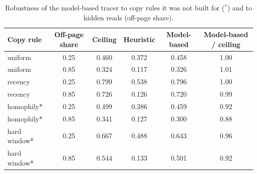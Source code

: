 \begin{table}[t]
\centering
\small
\caption{Robustness of the model-based tracer to copy rules it was not built for ($^{*}$) and to hidden reads (off-page share).}\label{tab:robust}
\begin{tabular}{@{}lccccc@{}}
\toprule
Copy rule & Off-page share & Ceiling & Heuristic & Model-based & Model-based / ceiling \\
\midrule
uniform & 0.25 & 0.460 & 0.372 & 0.458 & 1.00 \\
uniform & 0.85 & 0.324 & 0.117 & 0.326 & 1.01 \\
recency & 0.25 & 0.799 & 0.538 & 0.796 & 1.00 \\
recency & 0.85 & 0.726 & 0.126 & 0.720 & 0.99 \\
homophily* & 0.25 & 0.499 & 0.386 & 0.459 & 0.92 \\
homophily* & 0.85 & 0.341 & 0.127 & 0.300 & 0.88 \\
hard window* & 0.25 & 0.667 & 0.488 & 0.643 & 0.96 \\
hard window* & 0.85 & 0.544 & 0.133 & 0.501 & 0.92 \\
\bottomrule
\end{tabular}
\end{table}